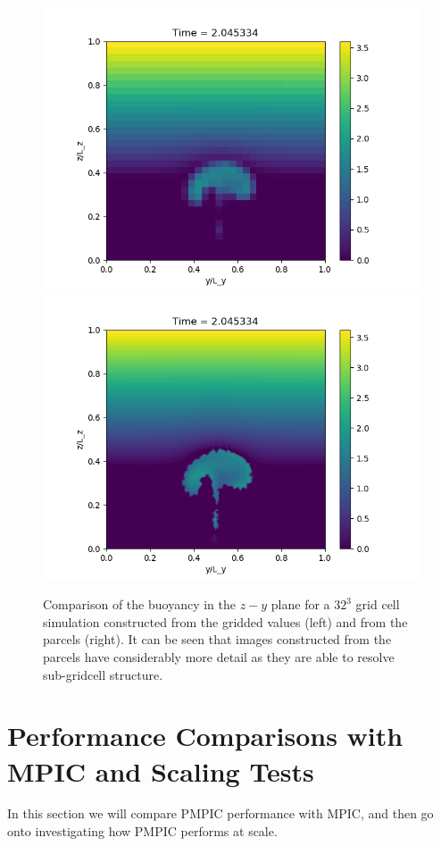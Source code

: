 \documentclass{article}
\begin{document}
\begin{figure}
  \begin{center}
    \includegraphics[scale=0.5]{pmpic_images/32grid.png}
    \includegraphics[scale=0.5]{pmpic_images/32parcels.png}
  \end{center}
  \caption{Comparison of the buoyancy in the $z-y$ plane for a $32^3$ grid cell simulation constructed from the gridded values (left) and from the parcels (right). It can be seen that images constructed from the parcels have considerably more detail as they are able to resolve sub-gridcell structure. \label{lowres}}
\end{figure}

\section{Performance Comparisons with MPIC and Scaling Tests} \label{performance}
In this section we will compare PMPIC performance with MPIC, and then go onto investigating how PMPIC performs at scale.
\end{document}
